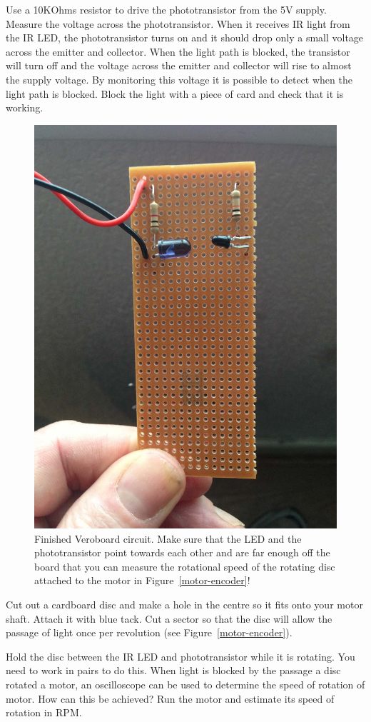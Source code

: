 \documentclass{instructions}
\begin{document}

Use a 10KOhms resistor to drive the phototransistor from the 5V supply. Measure
the voltage  across  the  phototransistor. When it receives IR light from
the  IR  LED,  the phototransistor turns on and it should drop only a small
voltage across the emitter and  collector.  When  the  light  path  is  blocked,
the  transistor  will  turn  off  and  the voltage  across  the  emitter  and
collector  will  rise  to  almost  the  supply  voltage.  By monitoring this
voltage it is possible to detect when the light path is blocked. Block the light
with a piece of card and check that it is working. 

\begin{figure}
    \centering
    \includegraphics[width=0.6\linewidth]{encoder-006}
    \caption{Finished  Veroboard  circuit.  Make  sure that the LED and the
    phototransistor point towards each other and are far enough off the board
    that you  can  measure  the  rotational  speed  of  the  rotating  disc
    attached  to  the motor in Figure~\ref{motor-encoder}!}
    \label{veroboard}
\end{figure}



Cut out a cardboard disc and make a hole in the centre so it fits onto your motor
shaft.  Attach it with blue tack. Cut a sector so that the disc will allow the
passage of light once per revolution (see Figure~\ref{motor-encoder}). 

Hold the disc between the IR LED and phototransistor while it is rotating. You
need to  work  in  pairs  to  do  this.  When  light  is  blocked  by  the
passage  a  disc  rotated  a motor, an oscilloscope can be used to determine the
speed of rotation of motor. How can this be achieved? Run the motor and estimate
its speed of rotation in RPM. 
\end{document}
